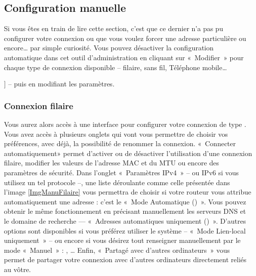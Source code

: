 \subsection{Configuration manuelle}
\label{ConfigReseauManuelle}
Si vous êtes en train de lire cette section, c'est que ce dernier n'a pas pu configurer votre connexion  ou que vous voulez forcer une adresse  particulière ou encore\dots{} par simple curiosité. Vous pouvez désactiver la configuration automatique dans cet outil d'administration en cliquant sur «~Modifier~» pour chaque type de connexion disponible -- filaire, sans fil, Téléphone mobile\ldots{] -- puis en modifiant les paramètres.
\subsubsection{Connexion filaire}
Vous aurez alors accès à une interface pour configurer votre connexion de type . Vous avez accès à plusieurs onglets qui vont vous permettre de choisir vos préférences, avec déjà, la possibilité de renommer la connexion. «~Connecter automatiquement» permet d'activer ou de désactiver l'utilisation d'une connexion filaire, modifier les valeurs de l'adresse MAC et du MTU ou encore des paramètres de sécurité. Dans l'onglet «~Paramètres IPv4~» -- ou IPv6 si vous utilisez un tel protocole --, une liste déroulante comme celle présentée dans l'image \ref{ImgManuFilaire} vous permettra de choisir si votre routeur vous attribue automatiquement une adresse  : c'est le «~Mode Automatique ()~». Vous pouvez obtenir le même fonctionnement en précisant manuellement les serveurs DNS et le domaine de recherche --- «~Adresses automatiques uniquement ()~». \label{RefAvahi} D'autres options sont disponibles si vous préférez utiliser le système  -- «~Mode Lien-local uniquement~» -- ou encore si vous désirez tout renseigner manuellement par le mode «~Manuel~» : , \ldots{} Enfin, «~Partagé avec d'autres ordinateurs~» vous permet de partager votre connexion avec d'autres ordinateurs directement reliés au vôtre.
}
